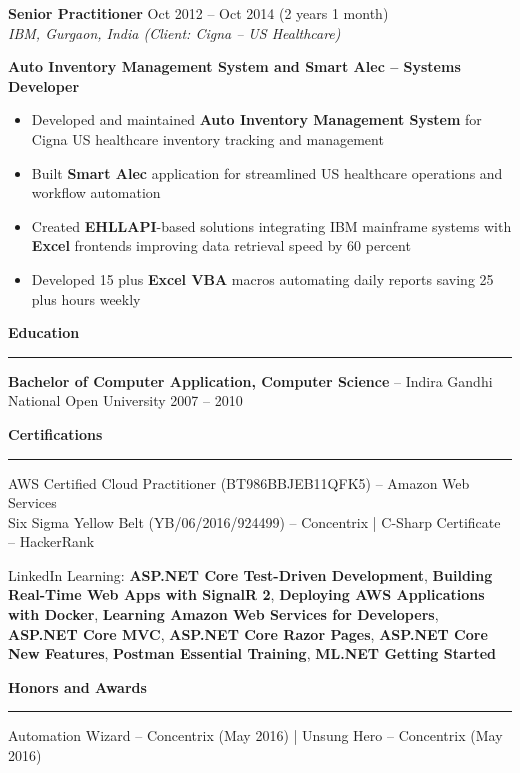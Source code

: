 \documentclass[10pt,a4paper]{article}
\newcommand{\sectionheader}[1]{%
    \vspace{8pt}
    {\large\bfseries #1}
    \vspace{2pt}
    \hrule
    \vspace{4pt}
}
\newcommand{\jobentry}[3]{%
    \vspace{4pt}
    {\normalsize\bfseries #1} \hfill #2\\
    \textit{#3}
}
\begin{document}
\jobentry{Senior Practitioner}{Oct 2012 -- Oct 2014 (2 years 1 month)}{IBM, Gurgaon, India (Client: Cigna -- US Healthcare)}

\textbf{Auto Inventory Management System and Smart Alec -- Systems Developer}
\begin{itemize}
    \item Developed and maintained \textbf{Auto Inventory Management System} for Cigna US healthcare inventory tracking and management
    \item Built \textbf{Smart Alec} application for streamlined US healthcare operations and workflow automation
    \item Created \textbf{EHLLAPI}-based solutions integrating IBM mainframe systems with \textbf{Excel} frontends improving data retrieval speed by 60 percent
    \item Developed 15 plus \textbf{Excel VBA} macros automating daily reports saving 25 plus hours weekly
\end{itemize}


\sectionheader{Education}

\textbf{Bachelor of Computer Application, Computer Science} -- Indira Gandhi National Open University \hfill 2007 -- 2010


\sectionheader{Certifications}

AWS Certified Cloud Practitioner (BT986BBJEB11QFK5) -- Amazon Web Services\\
Six Sigma Yellow Belt (YB/06/2016/924499) -- Concentrix | C-Sharp Certificate -- HackerRank

LinkedIn Learning: \textbf{ASP.NET Core Test-Driven Development}, \textbf{Building Real-Time Web Apps with SignalR 2}, \textbf{Deploying AWS Applications with Docker}, \textbf{Learning Amazon Web Services for Developers}, \textbf{ASP.NET Core MVC}, \textbf{ASP.NET Core Razor Pages}, \textbf{ASP.NET Core New Features}, \textbf{Postman Essential Training}, \textbf{ML.NET Getting Started}


\sectionheader{Honors and Awards}

Automation Wizard -- Concentrix (May 2016) | Unsung Hero -- Concentrix (May 2016)
\end{document}
